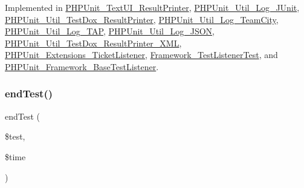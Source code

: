 Implemented in \mbox{\hyperlink{class_p_h_p_unit___text_u_i___result_printer_a1c0cb3bc58e5807530daf3a93783ed4e}{P\+H\+P\+Unit\+\_\+\+Text\+U\+I\+\_\+\+Result\+Printer}}, \mbox{\hyperlink{class_p_h_p_unit___util___log___j_unit_a1c0cb3bc58e5807530daf3a93783ed4e}{P\+H\+P\+Unit\+\_\+\+Util\+\_\+\+Log\+\_\+\+J\+Unit}}, \mbox{\hyperlink{class_p_h_p_unit___util___test_dox___result_printer_a1c0cb3bc58e5807530daf3a93783ed4e}{P\+H\+P\+Unit\+\_\+\+Util\+\_\+\+Test\+Dox\+\_\+\+Result\+Printer}}, \mbox{\hyperlink{class_p_h_p_unit___util___log___team_city_a1c0cb3bc58e5807530daf3a93783ed4e}{P\+H\+P\+Unit\+\_\+\+Util\+\_\+\+Log\+\_\+\+Team\+City}}, \mbox{\hyperlink{class_p_h_p_unit___util___log___t_a_p_a1c0cb3bc58e5807530daf3a93783ed4e}{P\+H\+P\+Unit\+\_\+\+Util\+\_\+\+Log\+\_\+\+T\+AP}}, \mbox{\hyperlink{class_p_h_p_unit___util___log___j_s_o_n_a1c0cb3bc58e5807530daf3a93783ed4e}{P\+H\+P\+Unit\+\_\+\+Util\+\_\+\+Log\+\_\+\+J\+S\+ON}}, \mbox{\hyperlink{class_p_h_p_unit___util___test_dox___result_printer___x_m_l_a1c0cb3bc58e5807530daf3a93783ed4e}{P\+H\+P\+Unit\+\_\+\+Util\+\_\+\+Test\+Dox\+\_\+\+Result\+Printer\+\_\+\+X\+ML}}, \mbox{\hyperlink{class_p_h_p_unit___extensions___ticket_listener_a1c0cb3bc58e5807530daf3a93783ed4e}{P\+H\+P\+Unit\+\_\+\+Extensions\+\_\+\+Ticket\+Listener}}, \mbox{\hyperlink{class_framework___test_listener_test_a1c0cb3bc58e5807530daf3a93783ed4e}{Framework\+\_\+\+Test\+Listener\+Test}}, and \mbox{\hyperlink{class_p_h_p_unit___framework___base_test_listener_a1c0cb3bc58e5807530daf3a93783ed4e}{P\+H\+P\+Unit\+\_\+\+Framework\+\_\+\+Base\+Test\+Listener}}.

\mbox{\label{interface_p_h_p_unit___framework___test_listener_a6de65eea8b294795cbc34c4c8cee8546}} 
\subsubsection{\texorpdfstring{end\+Test()}{endTest()}}
{\footnotesize\ttfamily end\+Test (\begin{DoxyParamCaption}\item[{\mbox{\hyperlink{interface_p_h_p_unit___framework___test}{P\+H\+P\+Unit\+\_\+\+Framework\+\_\+\+Test}}}]{\$test,  }\item[{}]{\$time }\end{DoxyParamCaption})}

